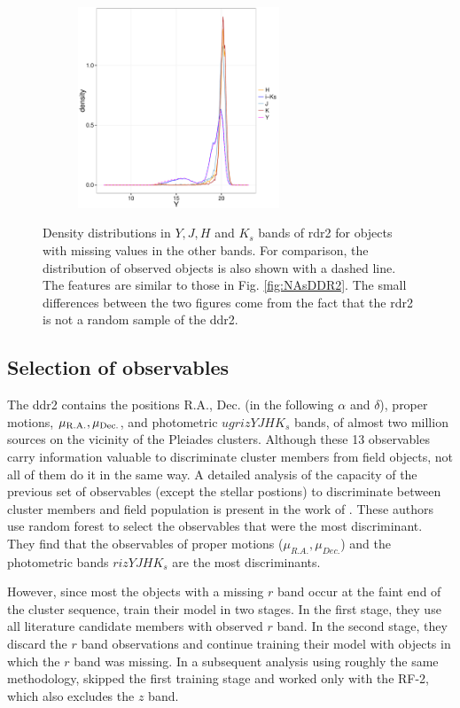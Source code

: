 \begin{figure}[ht!]
\begin{subfigure}[t]{0.45\textwidth}
      \includegraphics[page=4,height=6cm]{background/Figures/MissingDistributions.pdf}
    \end{subfigure}
\caption{Density distributions in $Y,J,H$ and $K_s$ bands of \gls{rdr2} for objects with missing values in the other bands. For comparison, the distribution of observed objects is also shown with a dashed line. The features are similar to those in Fig. \ref{fig:NAsDDR2}. The small differences between the two figures come from the fact that the \gls{rdr2} is not a random sample of the \gls{ddr2}.}
\label{fig:NAs}
\end{figure}

\subsection{Selection of observables}
\label{sect:RF-2}
\sloppy
The \gls{ddr2} contains the positions R.A., Dec. (in the following $\alpha$ and $\delta$), proper motions, $\mu_{\rm{R.A.}},\mu_{\rm{Dec.}}$, and photometric $ugrizYJHK_s$ bands, of almost two million sources on the vicinity of the Pleiades clusters. Although these 13 observables carry information valuable to discriminate cluster members from field objects, not all of them do it in the same way. A detailed analysis of the capacity of the previous set of observables (except the stellar postions) to discriminate between cluster members and field population is present in the work of \citet{Sarro2014}. These authors use random forest to select the observables that were the most discriminant. They find that the observables of  proper motions ($\mu_{R.A.},\mu_{Dec.}$) and the photometric bands $rizYJHK_s$ are the most discriminants. 

However, since most the objects with a missing $r$ band occur at the faint end of the cluster sequence, \citet{Sarro2014} train their model in two stages. In the first stage, they use all literature candidate members with observed $r$ band. In the second stage, they discard the $r$ band observations and continue training their model with objects in which the $r$ band was missing.  In a subsequent analysis using roughly the same methodology, \citet{Bouy2015} skipped the first training stage and worked only with the RF-2, which also excludes the $z$ band.

